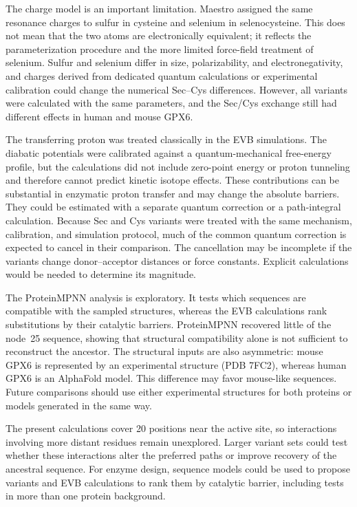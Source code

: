 The charge model is an important limitation. Maestro assigned the same resonance charges to sulfur in cysteine and selenium in selenocysteine. This does not mean that the two atoms are electronically equivalent; it reflects the parameterization procedure and the more limited force-field treatment of selenium. Sulfur and selenium differ in size, polarizability, and electronegativity, and charges derived from dedicated quantum calculations or experimental calibration could change the numerical Sec--Cys differences. However, all variants were calculated with the same parameters, and the Sec/Cys exchange still had different effects in human and mouse GPX6.

The transferring proton was treated classically in the EVB simulations. The diabatic potentials were calibrated against a quantum-mechanical free-energy profile, but the calculations did not include zero-point energy or proton tunneling and therefore cannot predict kinetic isotope effects. These contributions can be substantial in enzymatic proton transfer and may change the absolute barriers.\cite{VillaWarshel2001} They could be estimated with a separate quantum correction or a path-integral calculation. Because Sec and Cys variants were treated with the same mechanism, calibration, and simulation protocol, much of the common quantum correction is expected to cancel in their comparison. The cancellation may be incomplete if the variants change donor--acceptor distances or force constants. Explicit calculations would be needed to determine its magnitude.

The ProteinMPNN analysis is exploratory. It tests which sequences are compatible with the sampled structures, whereas the EVB calculations rank substitutions by their catalytic barriers. ProteinMPNN recovered little of the node~25 sequence, showing that structural compatibility alone is not sufficient to reconstruct the ancestor. The structural inputs are also asymmetric: mouse GPX6 is represented by an experimental structure (PDB 7FC2), whereas human GPX6 is an AlphaFold model. This difference may favor mouse-like sequences. Future comparisons should use either experimental structures for both proteins or models generated in the same way.

The present calculations cover 20 positions near the active site, so interactions involving more distant residues remain unexplored. Larger variant sets could test whether these interactions alter the preferred paths or improve recovery of the ancestral sequence. For enzyme design, sequence models could be used to propose variants and EVB calculations to rank them by catalytic barrier, including tests in more than one protein background.\cite{Tran2026Science}
